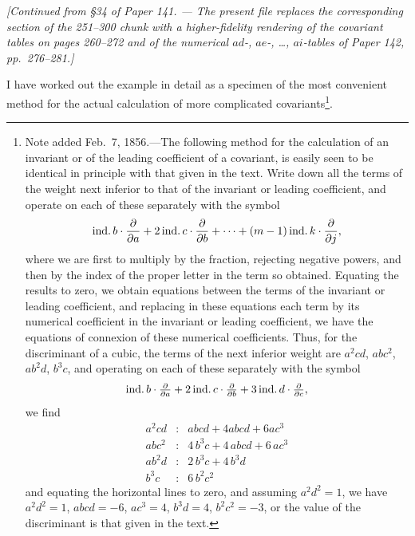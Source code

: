 \documentclass[11pt]{article}
\begin{document}

\noindent\textit{[Continued from \S 34 of Paper 141. --- The present file replaces the corresponding section of the 251--300 chunk with a higher-fidelity rendering of the covariant tables on pages 260--272 and of the numerical $ad$-, $ae$-, \ldots, $ai$-tables of Paper 142, pp.\ 276--281.]}

\medskip

\noindent I have worked out the example in detail as a specimen of the most convenient method for the actual calculation of more complicated covariants\footnote{Note added Feb.\ 7, 1856.---The following method for the calculation of an invariant or of the leading coefficient of a covariant, is easily seen to be identical in principle with that given in the text. Write down all the terms of the weight next inferior to that of the invariant or leading coefficient, and operate on each of these separately with the symbol
\[
\text{ind.\,} b \cdot \frac{\partial}{\partial a} + 2\,\text{ind.\,} c \cdot \frac{\partial}{\partial b} + \cdots + (m-1)\,\text{ind.\,} k \cdot \frac{\partial}{\partial j},
\]
where we are first to multiply by the fraction, rejecting negative powers, and then by the index of the proper letter in the term so obtained. Equating the results to zero, we obtain equations between the terms of the invariant or leading coefficient, and replacing in these equations each term by its numerical coefficient in the invariant or leading coefficient, we have the equations of connexion of these numerical coefficients. Thus, for the discriminant of a cubic, the terms of the next inferior weight are $a^2 cd$, $a b c^2$, $a b^2 d$, $b^3 c$, and operating on each of these separately with the symbol
\[
\text{ind.\,} b\cdot\tfrac{\partial}{\partial a} + 2\,\text{ind.\,} c\cdot\tfrac{\partial}{\partial b} + 3\,\text{ind.\,} d\cdot\tfrac{\partial}{\partial c},
\]
we find
\[
\begin{array}{rcl}
a^2 cd & : & abcd + 4 abcd + 6 a c^3 \\
a b c^2 & : & 4\, b^3 c + 4\,abcd + 6\,a c^3 \\
a b^2 d & : & 2\, b^3 c + 4\, b^3 d \\
b^3 c   & : & 6\, b^2 c^2
\end{array}
\]
and equating the horizontal lines to zero, and assuming $a^2 d^2 = 1$, we have $a^2 d^2 = 1$, $abcd = -6$, $a c^3 = 4$, $b^3 d = 4$, $b^2 c^2 = -3$, or the value of the discriminant is that given in the text.}.
\end{document}
